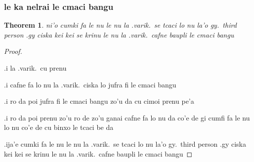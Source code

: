 \documentclass{article}
\newtheorem{thm}{Theorem}
\begin{document}
\subsubsection{le ka nelrai le cmaci bangu}
\begin{thm}
	ni'o cumki fa le nu le nu la .varik.\ se tcaci lo nu la'o gy.\ third person .gy ciska kei kei se krinu le nu la .varik.\ cafne baupli le cmaci bangu
\end{thm}
\begin{proof}
	${ }$

	.i la .varik.\ cu prenu

	.i cafne fa lo nu la .varik.\ ciska lo jufra fi le cmaci bangu

	.i ro da poi jufra fi le cmaci bangu zo'u da cu cimoi prenu pe'a

	.i ro da poi prenu zo'u ro de zo'u ganai cafne fa lo nu da co'e de gi cumfi fa le nu lo nu co'e de cu binxo le tcaci be da

	.ija'e cumki fa le nu le nu la .varik.\ se tcaci lo nu la'o gy.\ third person .gy ciska kei kei se krinu le nu la .varik.\ cafne baupli le cmaci bangu
\end{proof}
\end{document}
